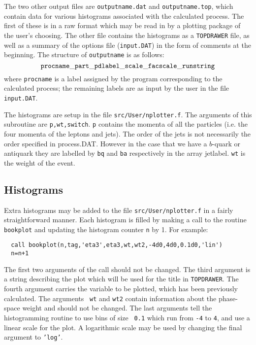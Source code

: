 \documentclass[12pt]{article}
\begin{document}
The two other output files are {\tt outputname.dat} and
{\tt outputname.top}, which contain data for various histograms associated
with the calculated process. The first of these is in a raw format 
which may be read in by a plotting package of the user's choosing. The
other file contains the histograms as a {\tt TOPDRAWER} file, as well
as a summary of the options file ({\tt input.DAT}) in the form of
comments at the beginning. The structure
of {\tt outputname} is as follows:
\begin{displaymath}
{\tt procname\_part\_pdlabel\_scale\_facscale\_runstring}
\end{displaymath}
where {\tt procname} is a label assigned by the program corresponding to
the calculated process; the remaining labels are as input by the user
in the file {\tt input.DAT}.

The histograms are  setup in the file {\tt src/User/nplotter.f}. The arguments of this
subroutine are { \tt p,wt,switch}. {\tt p} contains the momenta of all the particles
(i.e. the four momenta of the leptons and jets). The order of the jets is not
necessarily the  order specified in process.DAT.  However in the case that we have a 
$b$-quark or antiquark they are labelled by {\tt bq} and {\tt ba} respectively
in the array jetlabel. {\tt wt} is the weight of the event.  

\subsection{Histograms}
\label{sec:histos}

Extra histograms may be added to the file {\tt src/User/nplotter.f} in
a fairly straightforward manner. Each histogram is filled by making
a call to the routine {\tt bookplot} and updating the histogram
counter {\tt n} by 1. For example:

\begin{verbatim}
  call bookplot(n,tag,'eta3',eta3,wt,wt2,-4d0,4d0,0.1d0,'lin')
  n=n+1
\end{verbatim}
The first two arguments of the call should not be changed. The third
argument is a string describing the plot which will be used for the
title in {\tt TOPDRAWER}. The fourth argument carries the variable to
be plotted, which has been previously calculated. The arguments {\tt
wt} and {\tt wt2} contain information about the phase-space weight and
should not be changed. The
last arguments tell the histogramming routine to use bins of size {\tt
0.1} which run from {\tt -4} to {\tt 4}, and use a linear scale for
the plot. A logarithmic scale may be used by changing the final
argument to {\tt 'log'}.
\end{document}
